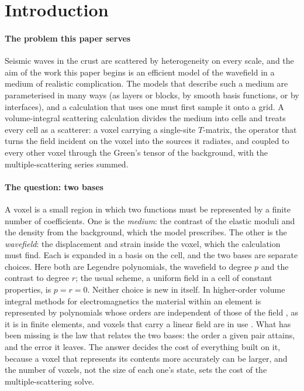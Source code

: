 \documentclass[preprint,review,12pt]{elsarticle}
\begin{document}
\linenumbers

\section{Introduction}\label{sec:intro}

\paragraph{The problem this paper serves} Seismic waves in the crust are scattered by heterogeneity
on every scale, and the aim of the work this paper begins is an efficient model of the wavefield in a
medium of realistic complication. The models that describe such a medium are parameterised in many
ways (as layers or blocks, by smooth basis functions, or by interfaces), and a calculation that uses
one must first sample it onto a grid. A volume-integral scattering calculation divides the medium into
cells and treats every cell as a scatterer: a voxel carrying a single-site $T$-matrix, the operator
that turns the field incident on the voxel into the sources it radiates, and coupled to every other
voxel through the Green's tensor of the background, with the multiple-scattering series summed.

\paragraph{The question: two bases} A voxel is a small region in which two functions must be
represented by a finite number of coefficients. One is the \emph{medium}: the contrast of the elastic
moduli and the density from the background, which the model prescribes. The other is the
\emph{wavefield}: the displacement and strain inside the voxel, which the calculation must find. Each
is expanded in a basis on the cell, and the two bases are separate choices. Here both are Legendre
polynomials, the wavefield to degree $p$ and the contrast to degree $r$; the usual scheme, a uniform
field in a cell of constant properties, is $p=r=0$. Neither
choice is new in itself. In higher-order volume integral methods for electromagnetics the material
within an element is represented by polynomials whose orders are independent of those of the field
\citep{Chobanyan2015}, as it is in finite elements, and voxels that carry a linear field are in use
\citep{Georgakis2020}. What has been missing is the law that relates the two bases: the order a given
pair attains, and the error it leaves. The answer decides the cost of everything built on it,
because a voxel that represents its contents more accurately can be larger, and the number of voxels,
not the size of each one's state, sets the cost of the multiple-scattering solve.
\end{document}
